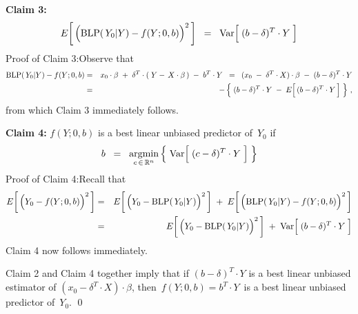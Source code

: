 \vskip 0.5cm
\noindent
\textbf{Claim 3:}
\begin{equation*}
E\!\left[\,\left(\blp(\,Y_{0}\vert Y) \overset{{\color{white}.}}{-} f(Y;0,b)\right)^{2}\,\right]
\;\; = \;\;
	\Var\!\left[\;(b \overset{{\color{white}.}}{-} \delta)^{T}\cdot Y\;\right]
\end{equation*}
Proof of Claim 3:\quad Observe that
\begin{eqnarray*}
\blp(\,Y_{0}\vert Y) - f(Y;0,b)
&=&
	x_{0}\cdot\beta \; + \; \delta^{T}\cdot(\;Y - \,X\cdot\beta\,) \; - \; b^{T} \cdot Y
\;\; = \;\;
	(x_{0} \; - \; \delta^{T} \cdot X) \cdot \beta \; - \; (b - \delta)^{T} \cdot Y
\\
&=&
	- \left\{\;
		(b - \delta)^{T} \cdot Y \; - \; E\!\left[\,(b \overset{{\color{white}.}}{-} \delta)^{T} \cdot Y\,\right]
		 \;\right\}\,,
\end{eqnarray*}
from which Claim 3 immediately follows.

\vskip 0.5cm
\noindent
\textbf{Claim 4:}\quad
$f(Y;0,b)$ is a best linear unbiased predictor of \,$Y_{0}$ if
\begin{equation*}
b \;\; = \;\;
	\underset{c\,\in\,\Re^{n}}{\textnormal{argmin}}
	\left\{\;
		\Var\!\left[\;(c \overset{{\color{white}.}}{-} \delta)^{T}\cdot Y\;\right]
		\;\right\}
\end{equation*}
Proof of Claim 4:\quad Recall that
\begin{eqnarray*}
E\!\left[\,\left(Y_{0} \overset{{\color{white}.}}{-} f(Y;0,b)\right)^{2}\,\right]
& = &
	E\!\left[\,\left(Y_{0} \overset{{\color{white}.}}{-} \blp(\,Y_{0}\vert Y)\right)^{2}\,\right]
	\; + \;
	E\!\left[\,\left(\blp(\,Y_{0}\vert Y) \overset{{\color{white}.}}{-} f(Y;0,b)\right)^{2}\,\right]
\\
& = &
	E\!\left[\,\left(Y_{0} \overset{{\color{white}.}}{-} \blp(\,Y_{0}\vert Y)\right)^{2}\,\right]
	\; + \;
	\Var\!\left[\;(b \overset{{\color{white}.}}{-} \delta)^{T}\cdot Y\;\right]
\end{eqnarray*}
Claim 4 now follows immediately.

\vskip 0.5cm
\noindent
Claim 2 and Claim 4 together imply that if
$(b-\delta)^{T} \cdot Y$ is a best linear unbiased estimator of $(x_{0} - \delta^{T}\cdot X) \cdot \beta$,
then
\,$f(Y;0,b) = b^{T} \cdot Y$\, is a best linear unbiased predictor of \,$Y_{0}$.
\qed


\renewcommand{\theenumi}{\roman{enumi}}
\renewcommand{\labelenumi}{\textnormal{(\theenumi)}$\;\;$}


